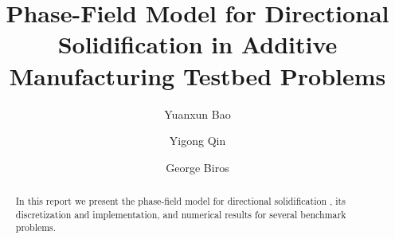 \documentclass[final,times]{elsarticle}
\numberwithin{equation}{section}
\begin{document}
\begin{frontmatter}



\title{Phase-Field Model for Directional Solidification in Additive Manufacturing Testbed Problems}
\author[oden]{Yuanxun Bao}

\author[utme]{Yigong Qin}


\author[oden]{George Biros}

\address[oden]{Oden Institute for Computational Engineering and Sciences, The University of Texas at Austin}
\address[utme]{Department of Mechanical Engineering, The University of Texas at Austin}






\begin{abstract}
In this report we present the phase-field model for directional solidification \cite{Echebarria2004,Tourret2015}, its discretization and implementation, and numerical results for several benchmark problems. 
\end{abstract}





\end{frontmatter}
\end{document}
